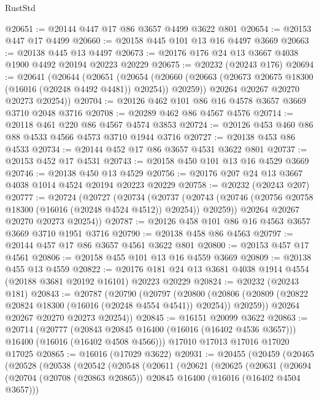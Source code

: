 \begin{lexlean}{RustStd}
\begin{coremodule}
@20651 := @20144 @447 @17 @86 @3657 @4499 @3622 @801
@20654 := @20153 @447 @17 @4499
@20660 := @20158 @445 @101 @13 @16 @4497 @3669
@20663 := @20138 @445 @13 @4497
@20673 := @20176 @176 @24 @13 @3667 @4038 @1900 @4492 @20194 @20223 @20229
@20675 := @20232 (@20243 @176)
@20694 := @20641
    (@20644
      (@20651
        (@20654
          (@20660 (@20663 (@20673 @20675 @18300 (@16016 (@20248 @4492 @4481)) @20254)) @20259))
        @20264
        @20267
        @20270
        @20273
        @20254))
@20704 := @20126 @462 @101 @86 @16 @4578 @3657 @3669 @3710 @2048 @3716
@20708 := @20289 @462 @86 @4567 @4576
@20714 := @20118 @461 @220 @86 @4567 @4574 @3853
@20724 := @20126 @453 @460 @86 @88 @4533 @4566 @4573 @3710 @1944 @3716
@20727 := @20138 @453 @86 @4533
@20734 := @20144 @452 @17 @86 @3657 @4531 @3622 @801
@20737 := @20153 @452 @17 @4531
@20743 := @20158 @450 @101 @13 @16 @4529 @3669
@20746 := @20138 @450 @13 @4529
@20756 := @20176 @207 @24 @13 @3667 @4038 @1014 @4524 @20194 @20223 @20229
@20758 := @20232 (@20243 @207)
@20777 := @20724
    (@20727
      (@20734
        (@20737
          (@20743 (@20746 (@20756 @20758 @18300 (@16016 (@20248 @4524 @4512)) @20254)) @20259))
        @20264
        @20267
        @20270
        @20273
        @20254))
@20787 := @20126 @458 @101 @86 @16 @4563 @3657 @3669 @3710 @1951 @3716
@20790 := @20138 @458 @86 @4563
@20797 := @20144 @457 @17 @86 @3657 @4561 @3622 @801
@20800 := @20153 @457 @17 @4561
@20806 := @20158 @455 @101 @13 @16 @4559 @3669
@20809 := @20138 @455 @13 @4559
@20822 := @20176 @181 @24 @13 @3681 @4038 @1914 @4554 (@20188 @3681 @20192 @16101) @20223 @20229
@20824 := @20232 (@20243 @181)
@20843 := @20787
    (@20790
      (@20797
        (@20800
          (@20806 (@20809 (@20822 @20824 @18300 (@16016 (@20248 @4554 @4541)) @20254)) @20259))
        @20264
        @20267
        @20270
        @20273
        @20254))
@20845 := @16151 @20099 @3622
@20863 := @20714
    (@20777
      (@20843 @20845 @16400 (@16016 (@16402 @4536 @3657)))
      @16400
      (@16016 (@16402 @4508 @4566)))
    @17010
    @17013
    @17016
    @17020
    @17025
@20865 := @16016 (@17029 @3622)
@20931 := @20455
    (@20459
      (@20465
        (@20528
          (@20538
            (@20542
              (@20548
                (@20611
                  (@20621
                    (@20625
                      (@20631
                        (@20694
                          (@20704
                            (@20708 (@20863 @20865))
                            @20845
                            @16400
                            (@16016 (@16402 @4504 @3657)))

\end{coremodule}
\end{lexlean}

